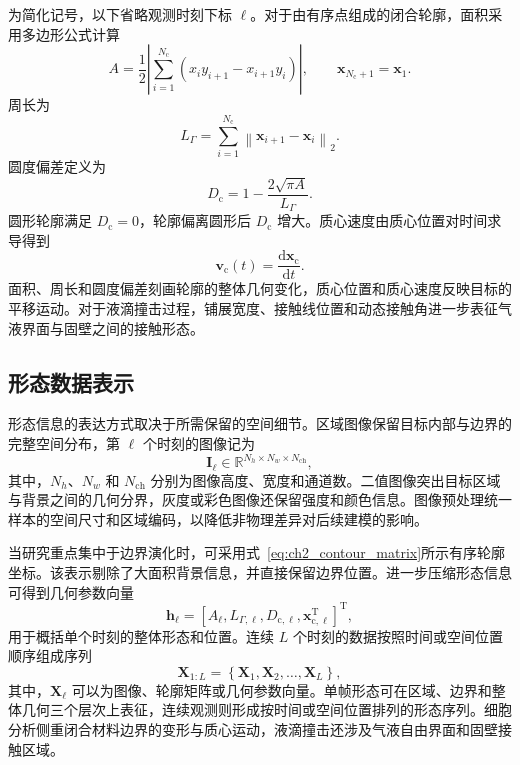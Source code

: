 为简化记号，以下省略观测时刻下标 $\ell$。对于由有序点组成的闭合轮廓，面积采用多边形公式计算
\begin{equation}
A
=
\frac{1}{2}
\left|
\sum_{i=1}^{N_{\mathrm c}}
\left(
x_i y_{i+1}-x_{i+1}y_i
\right)
\right|,
\qquad
\boldsymbol{x}_{N_{\mathrm c}+1}=\boldsymbol{x}_1.
\label{eq:ch2_polygon_area}
\end{equation}
周长为
\begin{equation}
L_{\Gamma}
=
\sum_{i=1}^{N_{\mathrm c}}
\left\|
\boldsymbol{x}_{i+1}-\boldsymbol{x}_i
\right\|_2.
\label{eq:ch2_polygon_perimeter}
\end{equation}
圆度偏差定义为
\begin{equation}
D_{\mathrm c}
=
1-
\frac{2\sqrt{\pi A}}{L_{\Gamma}}.
\label{eq:ch2_circularity_deviation}
\end{equation}
圆形轮廓满足 $D_{\mathrm c}=0$，轮廓偏离圆形后 $D_{\mathrm c}$ 增大。质心速度由质心位置对时间求导得到
\begin{equation}
\boldsymbol{v}_{\mathrm c}(t)
=
\frac{\mathrm d\boldsymbol{x}_{\mathrm c}}{\mathrm dt}.
\label{eq:ch2_centroid_velocity}
\end{equation}
面积、周长和圆度偏差刻画轮廓的整体几何变化，质心位置和质心速度反映目标的平移运动。对于液滴撞击过程，铺展宽度、接触线位置和动态接触角进一步表征气液界面与固壁之间的接触形态。

\subsection{形态数据表示}
\label{subsec:ch2_representation}

形态信息的表达方式取决于所需保留的空间细节。区域图像保留目标内部与边界的完整空间分布，第 $\ell$ 个时刻的图像记为
\begin{equation}
\boldsymbol{I}_{\ell}
\in
\mathbb{R}^{N_h\times N_w\times N_{\mathrm{ch}}},
\label{eq:ch2_image_representation}
\end{equation}
其中，$N_h$、$N_w$ 和 $N_{\mathrm{ch}}$ 分别为图像高度、宽度和通道数。二值图像突出目标区域与背景之间的几何分界，灰度或彩色图像还保留强度和颜色信息。图像预处理统一样本的空间尺寸和区域编码，以降低非物理差异对后续建模的影响。

当研究重点集中于边界演化时，可采用式~\eqref{eq:ch2_contour_matrix}所示有序轮廓坐标。该表示剔除了大面积背景信息，并直接保留边界位置。进一步压缩形态信息可得到几何参数向量
\begin{equation}
\boldsymbol{h}_{\ell}
=
\left[
A_{\ell},
L_{\Gamma,\ell},
D_{\mathrm c,\ell},
\boldsymbol{x}_{\mathrm c,\ell}^{\mathrm T}
\right]^{\mathrm T},
\label{eq:ch2_geometry_vector}
\end{equation}
用于概括单个时刻的整体形态和位置。连续 $L$ 个时刻的数据按照时间或空间位置顺序组成序列
\begin{equation}
\boldsymbol{X}_{1:L}
=
\left\{
\boldsymbol{X}_1,
\boldsymbol{X}_2,
\ldots,
\boldsymbol{X}_L
\right\},
\label{eq:ch2_shape_sequence}
\end{equation}
其中，$\boldsymbol{X}_{\ell}$ 可以为图像、轮廓矩阵或几何参数向量。单帧形态可在区域、边界和整体几何三个层次上表征，连续观测则形成按时间或空间位置排列的形态序列。细胞分析侧重闭合材料边界的变形与质心运动，液滴撞击还涉及气液自由界面和固壁接触区域。

